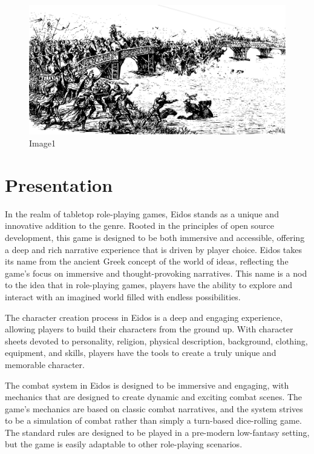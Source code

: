 \begin{figure}
\centering
\includegraphics{./images/index01.pdf}
\caption{Image1}
\end{figure}

\hypertarget{presentation}{%
\section{Presentation}\label{presentation}}

In the realm of tabletop role-playing games, Eidos stands as a unique
and innovative addition to the genre. Rooted in the principles of open
source development, this game is designed to be both immersive and
accessible, offering a deep and rich narrative experience that is driven
by player choice. Eidos takes its name from the ancient Greek concept of
the world of ideas, reflecting the game's focus on immersive and
thought-provoking narratives. This name is a nod to the idea that in
role-playing games, players have the ability to explore and interact
with an imagined world filled with endless possibilities.

The character creation process in Eidos is a deep and engaging
experience, allowing players to build their characters from the ground
up. With character sheets devoted to personality, religion, physical
description, background, clothing, equipment, and skills, players have
the tools to create a truly unique and memorable character.

The combat system in Eidos is designed to be immersive and engaging,
with mechanics that are designed to create dynamic and exciting combat
scenes. The game's mechanics are based on classic combat narratives, and
the system strives to be a simulation of combat rather than simply a
turn-based dice-rolling game. The standard rules are designed to be
played in a pre-modern low-fantasy setting, but the game is easily
adaptable to other role-playing scenarios.

